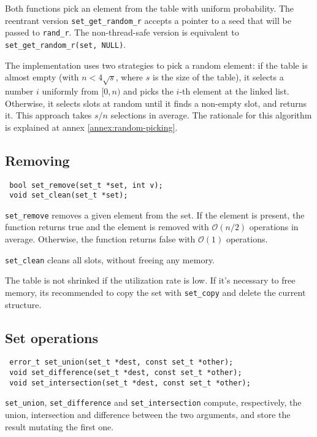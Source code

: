 Both functions pick an element from the table with uniform probability. The reentrant version \lstinline!set_get_random_r!
accepts a pointer to a seed that will be passed to \lstinline!rand_r!. The non-thread-safe version is equivalent to
\lstinline!set_get_random_r(set, NULL)!.

The implementation uses two strategies to pick a random element: if the table is almost empty (with $n < 4\sqrt{s}$, where $s$ is
the size of the table), it selects a number $i$ uniformly from $[0,n)$ and picks the $i$-th element at the linked list. Otherwise, 
it selects slots at random until it finds a non-empty slot, and returns it. This approach takes $s/n$ selections in average.
The rationale for this algorithm is explained at annex \ref{annex:random-picking}.

\subsection{Removing}

\begin{lstlisting}
 bool set_remove(set_t *set, int v);
 void set_clean(set_t *set);
\end{lstlisting}

\lstinline!set_remove! removes a given element from the set. If the element is present, the function returns true and the element is 
removed with $\mathcal{O}(n/2)$ operations in average. Otherwise, the function returns false with $\mathcal{O}(1)$ operations.

\lstinline!set_clean! cleans all slots, without freeing any memory.

The table is not shrinked if the utilization rate is low. If it's necessary to free memory, its recommended to copy the set with
\lstinline!set_copy! and delete the current structure.

\subsection{Set operations}

\begin{lstlisting}
 error_t set_union(set_t *dest, const set_t *other);
 void set_difference(set_t *dest, const set_t *other);
 void set_intersection(set_t *dest, const set_t *other);
\end{lstlisting}
 
\lstinline!set_union!, \lstinline!set_difference! and \lstinline!set_intersection! compute, respectively, the union, intersection 
and difference between the two arguments, and store the result mutating the first one. 

